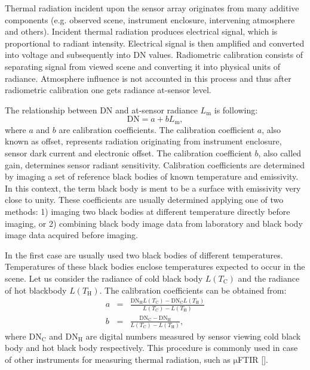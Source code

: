 Thermal radiation incident upon the sensor array originates from many additive components (e.g. observed scene, instrument enclosure, intervening atmosphere and others). Incident thermal radiation produces electrical signal, which is proportional to radiant intensity. Electrical signal is then amplified and converted into voltage and subsequently into DN values. Radiometric calibration consists of separating signal from viewed scene and converting it into physical units of radiance. Atmosphere influence is not accounted in this process and thus after radiometric calibration one gets radiance at-sensor level.

The relationship between DN and at-sensor radiance $L_\mathrm{m}$ is following:
$$ \mathrm{DN} = a + b L_\mathrm{m}, $$
where $a$ and $b$ are calibration coefficients. The calibration coefficient $a$, also known as offset, represents radiation originating from instrument enclosure, sensor dark current and electronic offset. The calibration coefficient $b$, also called gain, determines sensor radiant sensitivity. Calibration coefficients are determined by imaging a set of reference black bodies of known temperature and emissivity. In this context, the term black body is ment to be a surface with emissivity very close to unity. These coefficients are usually determined applying one of two methods: 1) imaging two black bodies at different temperature directly before imaging, or 2) combining black body image data from laboratory and black body image data acquired before imaging.

In the first case are usually used two black bodies of different temperatures. Temperatures of these black bodies enclose temperatures expected to occur in the scene. Let us consider the radiance of cold black body $L(T_\mathrm{C})$ and the radiance of hot blackbody $L(T_\mathrm{H})$. The calibration coefficients can be obtained from:
\begin{eqnarray*}
	a &=& \frac{\mathrm{DN}_\mathrm{H} L(T_\mathrm{C}) - \mathrm{DN}_\mathrm{C} L(T_\mathrm{H}) }{ L(T_\mathrm{C}) - L(T_\mathrm{H}) } \\
	b &=& \frac{\mathrm{DN}_\mathrm{C} - \mathrm{DN}_\mathrm{H}}{ L(T_\mathrm{C}) - L(T_\mathrm{H}) },
\end{eqnarray*}
where $\mathrm{DN}_\mathrm{C}$ and $\mathrm{DN}_\mathrm{H}$ are digital numbers measured by sensor viewing cold black body and hot black body respectively. This procedure is commonly used in case of other instruments for measuring thermal radiation, such as $\mathrm{\mu}$FTIR \ref{}.

